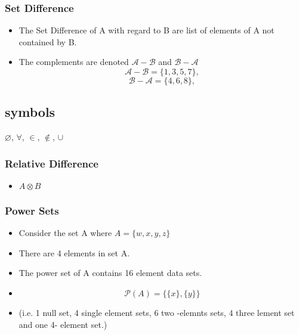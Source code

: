 \documentclass[11pt,a4paper,titlepage,oneside,openany]{article}
\numberwithin{equation}{section}
\numberwithin{algorithm}{section}
\numberwithin{figure}{section}
\numberwithin{table}{section}
\begin{document}
\subsubsection*{Set Difference}
\begin{itemize}
\item The Set Difference of A with regard to B are list of elements of A not contained by B.
\item The complements are denoted $\mathcal{A-B}$ and $\mathcal{B-A}$
\[ \mathcal{A-B} = \{1,3,5,7\}, \]
\[ \mathcal{B-A} = \{4,6,8\}, \]
\end{itemize}
\subsection*{symbols}
$\varnothing$,
$\forall$,
$\in$,
$\notin$,
$\cup$
\newpage
\subsubsection*{Relative Difference}
\begin{itemize}
\item $ A \otimes B$
\end{itemize}
\subsubsection*{Power Sets}
\begin{itemize}
\item Consider the set A where $ A = \{w,x,y,z\}$
\item There are 4 elements in set A.
\item The power set of A contains 16 element data sets.
\item \[  \mathcal{P}(A) = \{\{ x \}, \{ y \} \}  \]
\item (i.e. 1 null set, 4 single element sets, 6 two -elemnts sets, 4 three lement set and one 4- element set.)
\end{itemize}
\end{document}
